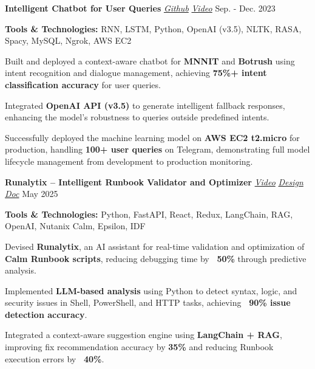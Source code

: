 \resumeSubHeadingListStart
    \resumeProject
      {{\textbf{Intelligent Chatbot for User Queries}} \href{https://github.com/dubeykirtiman/MNNIT_ChatBot}{\textit{\small{Github}}} \textbar{} \href{https://www.youtube.com/watch?v=mfgmaNysABo}{\textit{\small{Video}}}}
      {}
      {Sep. - Dec. 2023}
      {}
      \resumeItemListStart
        \item \textbf{Tools \& Technologies:} RNN, LSTM, Python, OpenAI (v3.5), NLTK, RASA, Spacy, MySQL, Ngrok, AWS EC2
        \item Built and deployed a context-aware chatbot for \textbf{MNNIT} and \textbf{Botrush} using intent recognition and dialogue management, achieving \textbf{75\%+ intent classification accuracy} for user queries.
        \item Integrated \textbf{OpenAI API (v3.5)} to generate intelligent fallback responses, enhancing the model's robustness to queries outside predefined intents.
        \item Successfully deployed the machine learning model on \textbf{AWS EC2 t2.micro} for production, handling \textbf{100+ user queries} on Telegram, demonstrating full model lifecycle management from development to production monitoring.
      \resumeItemListEnd

    \resumeProject
      {{\textbf{Runalytix – Intelligent Runbook Validator and Optimizer}} \href{https://youtu.be/aLlhrwAPgxA}{\textit{\small{Video}}} \textbar{} \href{https://docs.google.com/presentation/d/1qt7XzuZkbnZ_yUeG8MJ2ZQZqVL7QH2_8/edit?slide=id.p1#slide=id.p1}{\textit{\small{Design Doc}}}}
      {}
      {May 2025}
      {}
      \resumeItemListStart
        \item \textbf{Tools \& Technologies:} Python, FastAPI, React, Redux, LangChain, RAG, OpenAI, Nutanix Calm, Epsilon, IDF
        \item Devised \textbf{Runalytix}, an AI assistant for real-time validation and optimization of \textbf{Calm Runbook scripts}, reducing debugging time by \textbf{~50\%} through predictive analysis.
        \item Implemented \textbf{LLM-based analysis} using Python to detect syntax, logic, and security issues in Shell, PowerShell, and HTTP tasks, achieving \textbf{~90\% issue detection accuracy}.
        \item Integrated a context-aware suggestion engine using \textbf{LangChain + RAG}, improving fix recommendation accuracy by \textbf{35\%} and reducing Runbook execution errors by \textbf{~40\%}.
      \resumeItemListEnd

